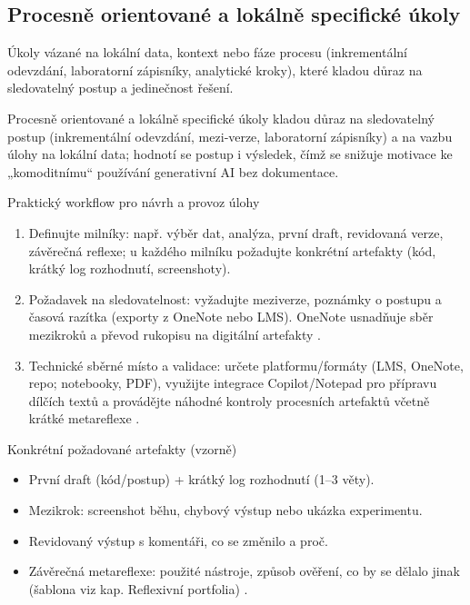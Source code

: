 \documentclass{report}%
\begin{document}
%
\subsection{Procesně orientované a lokálně specifické úkoly}%
Úkoly vázané na lokální data, kontext nebo fáze procesu (inkrementální odevzdání, laboratorní zápisníky, analytické kroky), které kladou důraz na sledovatelný postup a jedinečnost řešení.%


%
Procesně orientované a lokálně specifické úkoly kladou důraz na sledovatelný postup (inkrementální odevzdání, mezi‑verze, laboratorní zápisníky) a na vazbu úlohy na lokální data; hodnotí se postup i výsledek, čímž se snižuje motivace ke „komoditnímu“ používání generativní AI bez dokumentace.

Praktický workflow pro návrh a provoz úlohy
\begin{enumerate}
  \item Definujte milníky: např. výběr dat, analýza, první draft, revidovaná verze, závěrečná reflexe; u každého milníku požadujte konkrétní artefakty (kód, krátký log rozhodnutí, screenshoty).
  \item Požadavek na sledovatelnost: vyžadujte meziverze, poznámky o postupu a časová razítka (exporty z OneNote nebo LMS). OneNote usnadňuje sběr mezikroků a převod rukopisu na digitální artefakty \cite{kb_ai_101_tipu_pdf_04e4a115_page_8_1}.
  \item Technické sběrné místo a validace: určete platformu/formáty (LMS, OneNote, repo; notebooky, PDF), využijte integrace Copilot/Notepad pro přípravu dílčích textů a provádějte náhodné kontroly procesních artefaktů včetně krátké metareflexe \cite{kb_ai_101_tipu_pdf_04e4a115_page_14_1, kb_ai_101_tipu_pdf_04e4a115_page_8_1}.
\end{enumerate}

Konkrétní požadované artefakty (vzorně)
\begin{itemize}
  \item První draft (kód/postup) + krátký log rozhodnutí (1--3 věty).
  \item Mezikrok: screenshot běhu, chybový výstup nebo ukázka experimentu.
  \item Revidovaný výstup s komentáři, co se změnilo a proč.
  \item Závěrečná metareflexe: použité nástroje, způsob ověření, co by se dělalo jinak (šablona viz kap. Reflexivní portfolia) \cite{kb_ai_101_tipu_pdf_04e4a115_page_8_1}.
\end{itemize}
\end{document}
